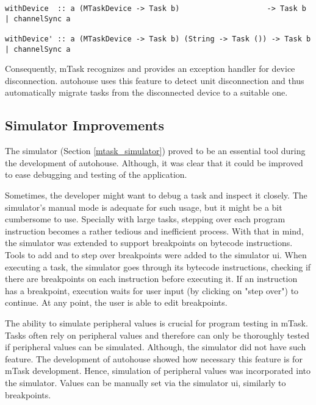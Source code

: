 \begin{lstlisting}[caption=Change in mTask to support a device disconnection handler,captionpos=b,label=with_device]
withDevice  :: a (MTaskDevice -> Task b)                    -> Task b | channelSync a

withDevice' :: a (MTaskDevice -> Task b) (String -> Task ()) -> Task b | channelSync a
\end{lstlisting}

Consequently, \gls{mTask} recognizes and provides an exception handler for device disconnection. \gls{autohouse} uses this feature to detect unit disconnection and thus automatically migrate tasks from the disconnected device to a suitable one.

\subsection{Simulator Improvements}\label{sec:sim_improv}

The simulator (Section \ref{mtask_simulator}) proved to be an essential tool during the development of \gls{autohouse}. Although, it was clear that it could be improved to ease debugging and testing of the application. 

Sometimes, the developer might want to debug a task and inspect it closely. The simulator's manual mode is adequate for such usage, but it might be a bit cumbersome to use. Specially with large tasks, stepping over each program instruction becomes a rather tedious and inefficient process. With that in mind, the simulator was extended to support breakpoints on bytecode instructions. Tools to add and to step over breakpoints were added to the simulator \acs{ui}. When executing a task, the simulator goes through its bytecode instructions, checking if there are breakpoints on each instruction before executing it. If an instruction has a breakpoint, execution waits for user input (by clicking on "step over") to continue. At any point, the user is able to edit breakpoints. 

The ability to simulate peripheral values is crucial for program testing in \gls{mTask}. Tasks often rely on peripheral values and therefore can only be thoroughly tested if peripheral values can be simulated. Although, the simulator did not have such feature. The development of \gls{autohouse} showed how necessary this feature is for \gls{mTask} development. Hence, simulation of peripheral values was incorporated into the simulator. Values can be manually set via the simulator \acs{ui}, similarly to breakpoints. 

